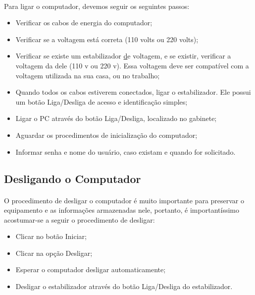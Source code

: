 \documentclass[hidelinks,12pt]{article}
\begin{document}
\paragraph{} Para ligar o computador, devemos seguir os seguintes passos: \\
\begin{itemize}
	
	\item Verificar os cabos de energia do computador;
	
	\item Verificar se a voltagem está correta (110 volts ou 220 volts);
	
	\item Verificar se existe um estabilizador \href{Fig:estabilizador} de voltagem, e se existir, verificar a voltagem da 
	dele (110 v ou 220 v). Essa voltagem deve ser compatível com a voltagem utilizada na sua casa, ou no trabalho;
	
	\item Quando todos os cabos estiverem conectados, ligar o estabilizador. Ele possui um botão Liga/Desliga de acesso e identificação simples;

	\item Ligar o PC através do botão Liga/Desliga, localizado no gabinete;
	
	\item Aguardar os procedimentos de inicialização do computador; 
	
	\item Informar senha e nome do usuário, caso existam e quando for solicitado.


\end{itemize}

\subsection{Desligando o Computador}
\paragraph{} O procedimento de desligar o computador é muito importante para preservar o equipamento e as informações armazenadas nele, portanto, é importantíssimo acostumar-se a seguir o procedimento de desligar:\\

\begin{itemize}
	\item Clicar no botão Iniciar;
	
	\item Clicar na opção Desligar; 
	
	\item Esperar o computador desligar automaticamente; 
	
	\item Desligar o estabilizador através do botão Liga/Desliga do estabilizador.
\end{itemize}
\end{document}
